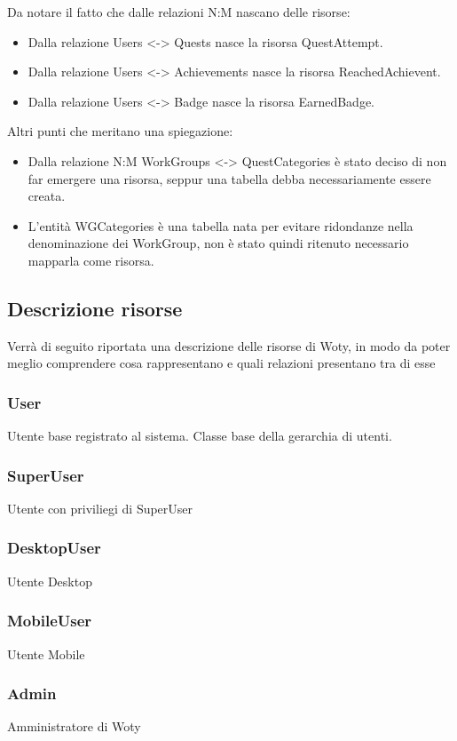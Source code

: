 Da notare il fatto che dalle relazioni N:M nascano delle risorse:

\begin{itemize}
	\item Dalla relazione Users <-> Quests nasce la risorsa QuestAttempt.
	\item Dalla relazione Users <-> Achievements nasce la risorsa ReachedAchievent.
	\item Dalla relazione Users <-> Badge nasce la risorsa EarnedBadge.
\end{itemize}

Altri punti che meritano una spiegazione:

\begin{itemize}
	\item Dalla relazione N:M WorkGroups <-> QuestCategories è stato deciso di non far emergere una risorsa, seppur una tabella debba necessariamente essere creata.
	\item L'entità WGCategories è una tabella nata per evitare ridondanze nella denominazione dei WorkGroup, non è stato quindi ritenuto necessario mapparla come risorsa.
\end{itemize}

\subsection{Descrizione risorse}
Verrà di seguito riportata una descrizione delle risorse di Woty, in modo da poter meglio comprendere cosa rappresentano e quali relazioni presentano tra di esse

\subsubsection{User} Utente base registrato al sistema. Classe base della gerarchia di utenti.
\subsubsection{SuperUser} Utente con priviliegi di SuperUser
\subsubsection{DesktopUser} Utente Desktop
\subsubsection{MobileUser} Utente Mobile
\subsubsection{Admin} Amministratore di Woty
